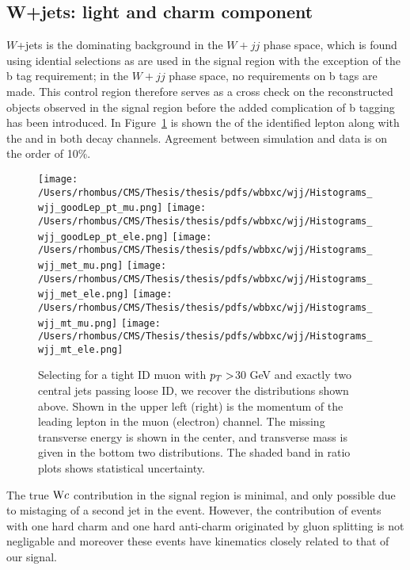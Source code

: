 \subsection{W+jets: light and charm component}

$W$+jets is the dominating background in the $W+jj$ phase space,
 which is found using idential selections as are used in 
 the signal region with the exception of the b tag requirement;
 in the $W+jj$ phase space, no requirements on b tags are made.
This control region therefore serves as a cross check on the 
 reconstructed objects observed in the signal region before
 the added complication of b tagging has been introduced. 
In Figure~\ref{fig:wjj_plots} is shown the \pt 
 of the identified lepton along with the \met and \mt
 in both decay channels.
Agreement between simulation and data is on the order of 10\%.

\begin{figure}
 \caption[\wjj control region for the \wbb measurement]{
  Selecting for a tight ID muon with $p_T>$30 GeV and exactly two central jets passing loose ID,
   we recover the distributions shown above. 
  Shown in the upper left (right)
   is the momentum of the leading lepton in the muon (electron) channel.
  The missing transverse energy is shown in the center,
  and transverse mass is given in the bottom two distributions.
  The shaded band in ratio plots shows statistical uncertainty. 
 } 
 \center
 \texttt{[image: /Users/rhombus/CMS/Thesis/thesis/pdfs/wbbxc/wjj/Histograms\_wjj\_goodLep\_pt\_mu.png]}
 \texttt{[image: /Users/rhombus/CMS/Thesis/thesis/pdfs/wbbxc/wjj/Histograms\_wjj\_goodLep\_pt\_ele.png]}
 \texttt{[image: /Users/rhombus/CMS/Thesis/thesis/pdfs/wbbxc/wjj/Histograms\_wjj\_met\_mu.png]}
 \texttt{[image: /Users/rhombus/CMS/Thesis/thesis/pdfs/wbbxc/wjj/Histograms\_wjj\_met\_ele.png]}
 \texttt{[image: /Users/rhombus/CMS/Thesis/thesis/pdfs/wbbxc/wjj/Histograms\_wjj\_mt\_mu.png]}
 \texttt{[image: /Users/rhombus/CMS/Thesis/thesis/pdfs/wbbxc/wjj/Histograms\_wjj\_mt\_ele.png]}
    \label{fig:wjj_plots}
\end{figure}

The true $\mathrm{W} c$ contribution in the signal region is minimal, 
and only possible due to mistaging of a second jet in
the event. However, the contribution of events
with one hard charm and one hard anti-charm originated by gluon 
splitting is not negligable and moreover these events have kinematics closely related 
to that of our signal. 

